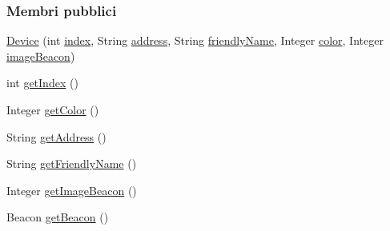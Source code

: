 \subsubsection*{Membri pubblici}
\begin{DoxyCompactItemize}
\item 
\hyperlink{classit_1_1unibo_1_1torsello_1_1bluetoothpositioning_1_1model_1_1Device_a2617f025dd33e0cae4adb3323245f865_a2617f025dd33e0cae4adb3323245f865}{Device} (int \hyperlink{classit_1_1unibo_1_1torsello_1_1bluetoothpositioning_1_1model_1_1Device_a55a01164b2388451f5e8344bfbc61ccc_a55a01164b2388451f5e8344bfbc61ccc}{index}, String \hyperlink{classit_1_1unibo_1_1torsello_1_1bluetoothpositioning_1_1model_1_1Device_a0abcf7e0df4ccc96e487c6f9b90b4e13_a0abcf7e0df4ccc96e487c6f9b90b4e13}{address}, String \hyperlink{classit_1_1unibo_1_1torsello_1_1bluetoothpositioning_1_1model_1_1Device_aa9a540b316c9de7f9b3a94f58570f6d3_aa9a540b316c9de7f9b3a94f58570f6d3}{friendly\+Name}, Integer \hyperlink{classit_1_1unibo_1_1torsello_1_1bluetoothpositioning_1_1model_1_1Device_a903c767011327aa70b1e6c9ecf3b72eb_a903c767011327aa70b1e6c9ecf3b72eb}{color}, Integer \hyperlink{classit_1_1unibo_1_1torsello_1_1bluetoothpositioning_1_1model_1_1Device_a54d308c064bbad3b1680895680697dd7_a54d308c064bbad3b1680895680697dd7}{image\+Beacon})
\item 
int \hyperlink{classit_1_1unibo_1_1torsello_1_1bluetoothpositioning_1_1model_1_1Device_a7f7e47588f721b360447d0f6ae2c4a9d_a7f7e47588f721b360447d0f6ae2c4a9d}{get\+Index} ()
\item 
Integer \hyperlink{classit_1_1unibo_1_1torsello_1_1bluetoothpositioning_1_1model_1_1Device_aad4f2885e5ed0279c7e0c6db684de5c3_aad4f2885e5ed0279c7e0c6db684de5c3}{get\+Color} ()
\item 
String \hyperlink{classit_1_1unibo_1_1torsello_1_1bluetoothpositioning_1_1model_1_1Device_ae4cd3fdda7414388cbda796f62543d5b_ae4cd3fdda7414388cbda796f62543d5b}{get\+Address} ()
\item 
String \hyperlink{classit_1_1unibo_1_1torsello_1_1bluetoothpositioning_1_1model_1_1Device_ab96e3e3bd6e9c9e27a42e619ca03ed71_ab96e3e3bd6e9c9e27a42e619ca03ed71}{get\+Friendly\+Name} ()
\item 
Integer \hyperlink{classit_1_1unibo_1_1torsello_1_1bluetoothpositioning_1_1model_1_1Device_a0fe04c6168a9a13bdf65eb0e5d407d37_a0fe04c6168a9a13bdf65eb0e5d407d37}{get\+Image\+Beacon} ()
\item 
Beacon \hyperlink{classit_1_1unibo_1_1torsello_1_1bluetoothpositioning_1_1model_1_1Device_a61b4951f3153550e8006f043eec034c2_a61b4951f3153550e8006f043eec034c2}{get\+Beacon} ()

\end{DoxyCompactItemize}

